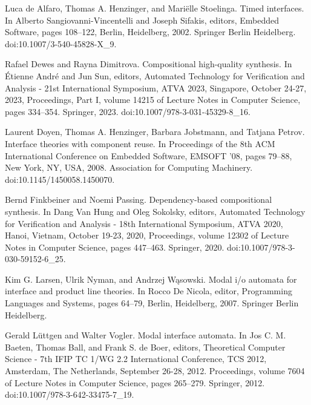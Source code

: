\par\noindent  [16]  Luca de Alfaro, Thomas A. Henzinger, and Mariëlle Stoelinga.  Timed interfaces.  In Alberto Sangiovanni-Vincentelli and Joseph Sifakis, editors, Embedded Software, pages 108–122, Berlin, Heidelberg, 2002. Springer Berlin Heidelberg.  doi:10.1007/3-540-45828-X\_9.  
 
\par\noindent  [17]  Rafael Dewes and Rayna Dimitrova.  Compositional high-quality synthesis.  In Étienne André and Jun Sun, editors, Automated Technology for Verification and Analysis - 21st International Symposium, ATVA 2023, Singapore, October 24-27, 2023, Proceedings, Part I, volume 14215 of Lecture Notes in Computer Science, pages 334–354. Springer, 2023.  doi:10.1007/978-3-031-45329-8\_16.  
 
\par\noindent  [18]  Laurent Doyen, Thomas A. Henzinger, Barbara Jobstmann, and Tatjana Petrov.  Interface theories with component reuse.  In Proceedings of the 8th ACM International Conference on Embedded Software, EMSOFT ’08, pages 79–88, New York, NY, USA, 2008. Association for Computing Machinery.  doi:10.1145/1450058.1450070.  
 
\par\noindent  [19]  Bernd Finkbeiner and Noemi Passing.  Dependency-based compositional synthesis.  In Dang Van Hung and Oleg Sokolsky, editors, Automated Technology for Verification and Analysis - 18th International Symposium, ATVA 2020, Hanoi, Vietnam, October 19-23, 2020, Proceedings, volume 12302 of Lecture Notes in Computer Science, pages 447–463. Springer, 2020.  doi:10.1007/978-3-030-59152-6\_25.  
 
\par\noindent  [20]  Kim G. Larsen, Ulrik Nyman, and Andrzej Wąsowski.  Modal i/o automata for interface and product line theories.  In Rocco De Nicola, editor, Programming Languages and Systems, pages 64–79, Berlin, Heidelberg, 2007. Springer Berlin Heidelberg.  
 
\par\noindent  [21]  Gerald Lüttgen and Walter Vogler.  Modal interface automata.  In Jos C. M. Baeten, Thomas Ball, and Frank S. de Boer, editors, Theoretical Computer Science - 7th IFIP TC 1/WG 2.2 International Conference, TCS 2012, Amsterdam, The Netherlands, September 26-28, 2012. Proceedings, volume 7604 of Lecture Notes in Computer Science, pages 265–279. Springer, 2012.  doi:10.1007/978-3-642-33475-7\_19.  
 
